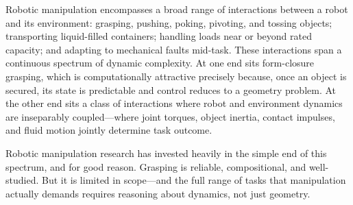 Robotic manipulation encompasses a broad range of interactions between a robot and its environment: grasping, pushing, poking, pivoting, and tossing objects; transporting liquid-filled containers; handling loads near or beyond rated capacity; and adapting to mechanical faults mid-task.
These interactions span a continuous spectrum of dynamic complexity.
At one end sits form-closure grasping, which is computationally attractive precisely because, once an object is secured, its state is predictable and control reduces to a geometry problem.
At the other end sits a class of interactions where robot and environment dynamics are inseparably coupled---where joint torques, object inertia, contact impulses, and fluid motion jointly determine task outcome.

Robotic manipulation research has invested heavily in the simple end of this spectrum, and for good reason.
Grasping is reliable, compositional, and well-studied.
But it is limited in scope---and the full range of tasks that manipulation actually demands requires reasoning about dynamics, not just geometry.
